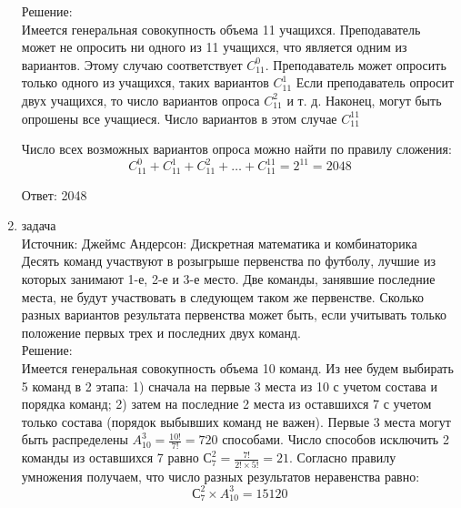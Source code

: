 \documentclass[a4paper,14pt]{extreport} %
\begin{document}
\begin{center}
\begin{enumerate}
						Решение:\\
						Имеется генеральная совокупность объема 11 учащихся.
						Преподаватель может не опросить ни одного из 11 учащихся, что
						является одним из вариантов. Этому случаю соответствует $C_{11}^0$.
						Преподаватель может опросить только одного из учащихся, таких
						вариантов $C_{11}^1$
						Если преподаватель опросит двух учащихся, то число
						вариантов опроса $C_{11}^2$ и т. д.
						Наконец, могут быть опрошены все учащиеся. Число
						вариантов в этом случае $C_{11}^{11}$
						
						Число всех возможных вариантов опроса можно найти по правилу
						сложения:
						\begin{equation}
							C_{11}^0 + C_{11}^1 + C_{11}^2 + \ldots  + C_{11}^{11} = 2^{11} = 2048
						\end{equation}
						
						Ответ: 2048
						
						\item {\large задача  }\\
						Источник: Джеймс Андерсон: Дискретная математика и комбинаторика\\
						\vspace{15pt}
						Десять команд участвуют в розыгрыше первенства по
						футболу, лучшие из которых занимают 1-е, 2-е и 3-е место. Две
						команды, занявшие последние места, не будут участвовать в
						следующем таком же первенстве. Сколько разных вариантов
						результата первенства может быть, если учитывать только положение
						первых трех и последних двух команд.\\
						
					
						\vspace{15pt}
						Решение:\\
						 Имеется генеральная совокупность объема 10
						команд. Из нее будем выбирать 5 команд в 2 этапа:
						1) сначала на первые 3 места из 10 с учетом состава и порядка
						команд;
						2) затем на последние 2 места из оставшихся 7 с учетом только
						состава (порядок выбывших команд не важен). Первые 3 места могут
						быть распределены $A_{10}^3 = \frac{10!}{7!}= 720$ способами.						
						Число способов исключить 2 команды из оставшихся 7 равно $С_{7}^2 = \frac{7!}{2!\times5!}= 21$.
						Согласно правилу умножения получаем, что число разных результатов неравенства равно:
						\begin{equation}
							С_{7}^2 \times A_{10}^3 = 15120
						\end{equation}
						

\end{enumerate}
\end{center}
\end{document}
